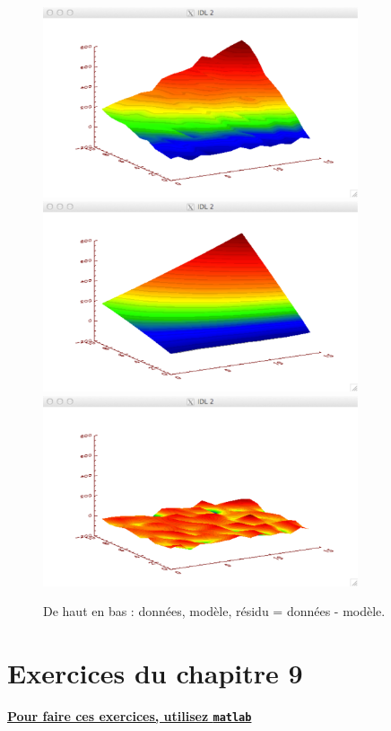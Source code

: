 \begin{figure}[p]
    \centering
    \includegraphics[width=9.3cm]{assets/figures/exempleData.pdf}\vspace{5mm}
    \includegraphics[width=9.3cm]{assets/figures/exempleModel.pdf}\vspace{5mm}
    \includegraphics[width=9.3cm]{assets/figures/exempleResidu.pdf}
    \caption{De haut en bas : données, modèle, résidu = données - modèle.}
    \label{fig:dmr}
\end{figure}

\newpage

\section{Exercices du chapitre 9}

\begin{center}
    \Large \bf {\underline{Pour faire ces exercices, utilisez \texttt{matlab}}}
\end{center}

